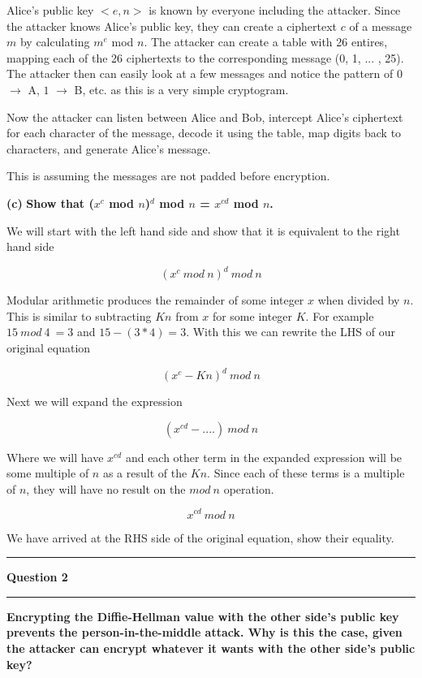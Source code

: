 \documentclass[11pt]{article}
\newcommand\question[2]{\vspace{.25in}\hrule\textbf{#1}\vspace{.5em}\hrule\vspace{.10in}}
\renewcommand\part[1]{\vspace{.10in}\textbf{(#1)}}
\begin{document}
Alice's public key ${<}e, n{>}$ is known by everyone including the attacker. Since the attacker knows Alice's public key, they can create a ciphertext $c$ of a message $m$ by calculating $m^e$ mod $n$. The attacker can create a table with 26 entires, mapping each of the 26 ciphertexts to the corresponding message (0, 1, ... , 25). The attacker then can easily look at a few messages and notice the pattern of $0$ $\rightarrow$ A, $1$ $\rightarrow$ B, etc. as this is a very simple cryptogram.

Now the attacker can listen between Alice and Bob, intercept Alice's ciphertext for each character of the message, decode it using the table, map digits back to characters, and generate Alice's message.

This is assuming the messages are not padded before encryption.

\part{c} \textbf{Show that ($x^c$ mod $n$)$^d$ mod $n$ = $x^{cd}$ mod $n$.}

We will start with the left hand side and show that it is equivalent to the right hand side

$$(x^c \ mod \ n)^d \ mod \ n$$

Modular arithmetic produces the remainder of some integer $x$ when divided by $n$. This is similar to subtracting $Kn$ from $x$ for some integer $K$. For example $15 \ mod \ 4 \ = 3$ and $15 - (3 * 4) = 3$. With this we can rewrite the LHS of our original equation

$$(x^c - Kn)^d \ mod \ n$$

Next we will expand the expression

$$(x^{cd} - ....) \ mod \ n$$

Where we will have $x^{cd}$ and each other term in the expanded expression will be some multiple of $n$ as a result of the $Kn$. Since each of these terms is a multiple of $n$, they will have no result on the $mod \ n$ operation.

$$x^{cd} \ mod \ n$$

We have arrived at the RHS side of the original equation, show their equality.


\question{Question 2}

\part{a} \textbf{Encrypting the Diffie-Hellman value with the other side's public key prevents the person-in-the-middle attack. Why is this the case, given the attacker can encrypt whatever it wants with the other side's public key?}
\end{document}
